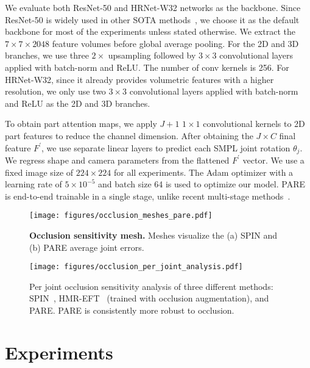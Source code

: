 \documentclass[10pt,twocolumn,letterpaper,usenames,dvipsnames]{article}
\begin{document}
We evaluate both ResNet-50 \cite{he2016resnet} and HRNet-W32 \cite{hrnet} networks as the backbone. 
Since ResNet-50 is widely used in other SOTA methods~\cite{kanazawa_hmr,kocabas2019vibe,SPIN:ICCV:2019}, we choose it as the default backbone for most of the experiments unless stated otherwise. 
We extract the $7\times7\times2048$ feature volumes before global average pooling. For the 2D and 3D branches, we use three $2\times$ upsampling followed by $3\times3$ convolutional layers applied with batch-norm and ReLU. The number of conv kernels is 256. 
For HRNet-W32, since it already provides volumetric features with a higher resolution, we only use two $3\times3$ convolutional layers applied with batch-norm and ReLU as the 2D and 3D branches. 

To obtain part attention maps, we apply $J+1$ $1\times1$ convolutional kernels to 2D part features to reduce the channel dimension. 
After obtaining the $J\times C$ final feature $F^\prime$, we use separate linear layers to predict each SMPL joint rotation $\theta_j$. We regress shape and camera parameters from the flattened $F^\prime$ vector. We use a fixed image size of $224\times224$ for all experiments. The Adam optimizer with a learning rate of $5\times10^{-5}$ and batch size 64 is used to optimize our model. PARE is end-to-end trainable in a single stage, unlike recent multi-stage methods~\cite{Choi_2020_ECCV_Pose2Mesh,guler_2019_CVPR,Moon_2020_ECCV_I2L-MeshNet,zanfir2020weakly}. 	\begin{figure}[t]
	\centering
	\texttt{[image: figures/occlusion\_meshes\_pare.pdf]}
	\caption{\textbf{Occlusion sensitivity mesh.} Meshes visualize the (a) SPIN and (b) PARE average joint errors.
	}
	\label{fig:occ_meshes_pare}
	\vspace{-2ex}
\end{figure}{}

\begin{figure}[t]
	\centering
	\texttt{[image: figures/occlusion\_per\_joint\_analysis.pdf]}
	\vspace{-0.1in}
	\caption{Per joint occlusion sensitivity analysis of three different methods: SPIN~\cite{SPIN:ICCV:2019}, HMR-EFT~\cite{joo2020eft} (trained with occlusion augmentation), and PARE. PARE is consistently more robust to occlusion.}
	\label{fig:occ_analysis}
	\vspace{-2ex}
\end{figure}{}

\section{Experiments}
\label{experiments}
\end{document}
